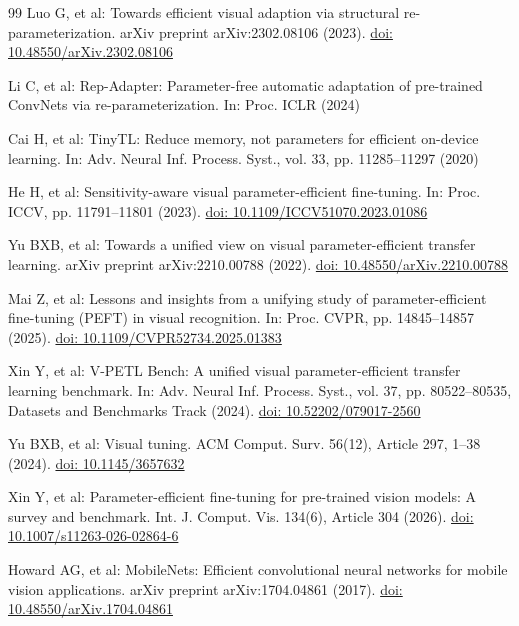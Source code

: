 \documentclass[pdflatex,sn-mathphys-num]{sn-jnl}
\theoremstyle{thmstyleone}
\theoremstyle{thmstyletwo}
\theoremstyle{thmstylethree}
\begin{document}
\begin{thebibliography}{99}
Luo G, et al:
Towards efficient visual adaption via structural re-parameterization.
arXiv preprint arXiv:2302.08106 (2023).
\href{https://doi.org/10.48550/arXiv.2302.08106}{doi: 10.48550/arXiv.2302.08106}

Li C, et al:
Rep-Adapter: Parameter-free automatic adaptation of pre-trained ConvNets via re-parameterization.
In: Proc. ICLR (2024)

Cai H, et al:
TinyTL: Reduce memory, not parameters for efficient on-device learning.
In: Adv. Neural Inf. Process. Syst., vol. 33, pp. 11285--11297 (2020)

He H, et al:
Sensitivity-aware visual parameter-efficient fine-tuning.
In: Proc. ICCV, pp. 11791--11801 (2023).
\href{https://doi.org/10.1109/ICCV51070.2023.01086}{doi: 10.1109/ICCV51070.2023.01086}

Yu BXB, et al:
Towards a unified view on visual parameter-efficient transfer learning.
arXiv preprint arXiv:2210.00788 (2022).
\href{https://doi.org/10.48550/arXiv.2210.00788}{doi: 10.48550/arXiv.2210.00788}

Mai Z, et al:
Lessons and insights from a unifying study of parameter-efficient fine-tuning (PEFT) in visual recognition.
In: Proc. CVPR, pp. 14845--14857 (2025).
\href{https://doi.org/10.1109/CVPR52734.2025.01383}{doi: 10.1109/CVPR52734.2025.01383}

Xin Y, et al:
V-PETL Bench: A unified visual parameter-efficient transfer learning benchmark.
In: Adv. Neural Inf. Process. Syst., vol. 37, pp. 80522--80535,
Datasets and Benchmarks Track (2024).
\href{https://doi.org/10.52202/079017-2560}{doi: 10.52202/079017-2560}

Yu BXB, et al:
Visual tuning.
ACM Comput. Surv. 56(12), Article 297, 1--38 (2024).
\href{https://doi.org/10.1145/3657632}{doi: 10.1145/3657632}

Xin Y, et al:
Parameter-efficient fine-tuning for pre-trained vision models: A survey and benchmark.
Int. J. Comput. Vis. 134(6), Article 304 (2026).
\href{https://doi.org/10.1007/s11263-026-02864-6}{doi: 10.1007/s11263-026-02864-6}

Howard AG, et al:
MobileNets: Efficient convolutional neural networks for mobile vision applications.
arXiv preprint arXiv:1704.04861 (2017).
\href{https://doi.org/10.48550/arXiv.1704.04861}{doi: 10.48550/arXiv.1704.04861}


\end{thebibliography}
\end{document}
